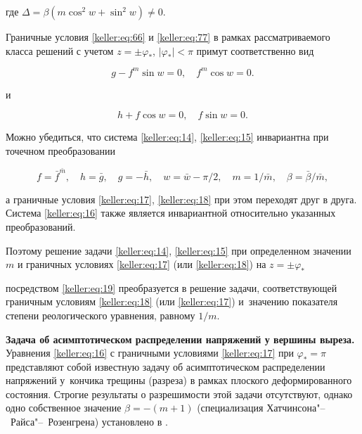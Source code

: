 где $\Delta=\beta(m\cos^2 w+\sin^2 w)\neq 0.$ 



Граничные условия \eqref{keller:eq:66} и \eqref{keller:eq:77} в рамках рассматриваемого класса решений с учетом $z=\pm\varphi_\ast$, $|\varphi_\ast|<\pi$ примут соответственно вид

\begin{equation}\label{keller:eq:17}

	g-f^m\sin w=0,\quad f^m\cos w=0.

\end{equation}

и

\begin{equation}\label{keller:eq:18}

	h+f\cos w=0,\quad f\sin w=0.

\end{equation}



Можно убедиться, что система \eqref{keller:eq:14}, \eqref{keller:eq:15} инвариантна при точечном преобразовании 

\begin{equation}\label{keller:eq:19}

 f= \bar{f}^{\bar m}, \quad	h = \bar{g},\quad  g = -\bar{h},\quad  w = \bar{w}-\pi/2,\quad  m=1/\bar{m},\quad  \beta=\bar{\beta}/\bar{m}, 

\end{equation}

а граничные условия \eqref{keller:eq:17}, \eqref{keller:eq:18} при этом переходят друг в друга. Система \eqref{keller:eq:16} также является инвариантной относительно указанных преобразований. 

Поэтому решение задачи \eqref{keller:eq:14}, \eqref{keller:eq:15} при определенном значении $m$ и граничных условиях \eqref{keller:eq:17} (или \eqref{keller:eq:18}) на $z=\pm\varphi_{\ast}$ 

посредством \eqref{keller:eq:19} преобразуется в решение задачи, соответствующей граничным условиям \eqref{keller:eq:18} (или \eqref{keller:eq:17}) и~значению показателя степени реологического уравнения, равному $1/m.$



\smallskip





{\bf Задача об асимптотическом распределении напряжений у вершины выреза.} Уравнения \eqref{keller:eq:16} с граничными условиями \eqref{keller:eq:17} при $\varphi_\ast=\pi$ представляют собой известную задачу об асимптотическом распределении напряжений у~кончика трещины (разреза) в рамках плоского деформированного состояния. Строгие результаты о разрешимости этой задачи отсутствуют, однако  одно собственное значение $\beta=-(m+1)$ (специализация Хатчинсона"--~Райса"--~Розенгрена) установлено в \cite{keller:bib:Rice, keller:bib:Hut1}. 



